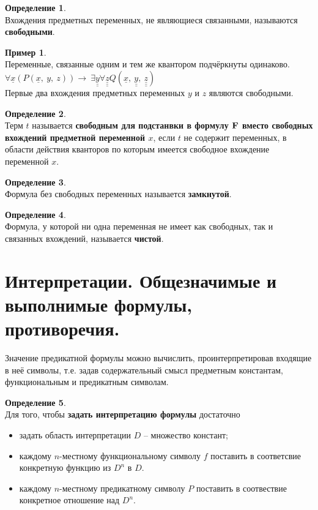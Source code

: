 \documentclass[a4paper,12pt]{article}
\theoremstyle{definition} %
\newtheorem{definition}{Определение}[section]
\newtheorem{example}{Пример}[section]
\theoremstyle{definition} %
\theoremstyle{remark} %
\begin{document}
	\begin{definition} \ \\[1ex]
		Вхождения предметных переменных, не являющиеся связанными, называются \textbf{свободными}.
	\end{definition}

	\begin{example} \ \\[1ex]
		Переменные, связанные одним и тем же квантором подчёркнуты одинаково.\\[1ex]
		$\forall \underline{x} (P(\underline{x}, \ y, \ z)) \rightarrow \ \exists \underline{\underline{y}} \forall \underline{\underline{\underline{z}}} Q(\underline{x}, \ \underline{\underline{y}}, \ \underline{\underline{\underline{z}}})$\\[1ex]
		Первые два вхождения предметных переменных $y$ и $z$ являются свободными.
	\end{example}

	\begin{definition}\ \\[1ex]
		Терм $t$ называется \textbf{свободным для подстанвки в формулу $\bf{F}$ вместо свободных вхождений предметной переменной $x$}, если $t$ не содержит переменных, в области действия кванторов по которым имеется свободное вхождение переменной $x$.
	\end{definition}

	\begin{definition}\ \\[1ex]
		Формула без свободных переменных называется \textbf{замкнутой}.
	\end{definition}

	\begin{definition}\ \\[1ex]
		Формула, у которой ни одна переменная не имеет как свободных, так и связанных вхождений, называется \textbf{чистой}.
	\end{definition}

\section{Интерпретации. Общезначимые и выполнимые формулы, противоречия.}
	Значение предикатной формулы можно вычислить, проинтерпретировав входящие в неё символы, т.е. задав содержательный смысл предметным константам, функциональным и предикатным символам.
	
	\begin{definition}\ \\[1ex]
		Для того, чтобы \textbf{задать интерпретацию формулы} достаточно
		\begin{itemize}
			\item задать область интерпретации $D$ -- множество констант;
			\item каждому $n$-местному функциональному символу $f$ поставить в соответсвие конкретную функцию из $D^{n}$ в $D$.
			\item каждому $n$-местному предикатному символу $P$ поставить в соотвествие конкретное отношение над $D^{n}$.
		\end{itemize}
	\end{definition}
\end{document}
